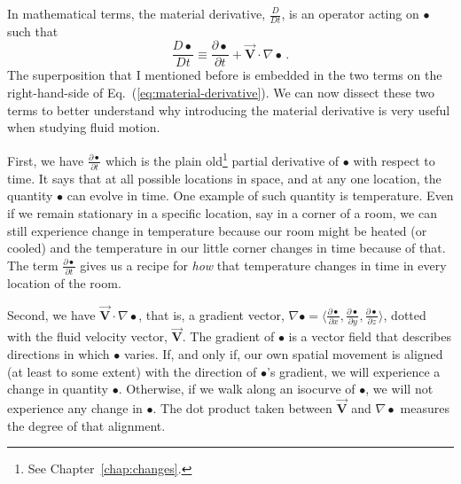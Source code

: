 In mathematical terms, the material derivative, $\frac{D}{Dt}$, is an operator acting on $\bullet$ such that
\begin{equation} \label{eq:material-derivative}
\frac{D \bullet}{D t} \equiv \frac{\partial \bullet}{\partial t} + \vec{\bm{V}} \cdot \nabla \bullet \, .
\end{equation}
The superposition that I mentioned before is embedded in the two terms on the right-hand-side of Eq.~(\ref{eq:material-derivative}).
We can now dissect these two terms to better understand why introducing the material derivative is very useful when studying fluid motion.

First, we have $\frac{\partial \bullet}{\partial t}$ which is the plain old\footnote{See Chapter~\ref{chap:changes}.} partial derivative of $\bullet$ with respect to time. It says that at all possible locations in space, and at any one location, the quantity $\bullet$ can evolve in time. One example of such quantity is temperature. Even if we remain stationary in a specific location, say in a corner of a room, we can still experience change in temperature because our room might be heated (or cooled) and the temperature in our little corner changes in time because of that. The term $\frac{\partial \bullet}{\partial t}$ gives us a recipe for \textit{how} that temperature changes in time in every location of the room.

Second, we have $\vec{\bm{V}} \cdot \nabla \bullet$, that is, a gradient vector, $\nabla \bullet = \langle \frac{\partial \bullet}{\partial x}, \frac{\partial \bullet}{\partial y}, \frac{\partial \bullet}{\partial z} \rangle$, dotted with the fluid velocity vector, $\vec{\bm{V}}$. 
The gradient of $\bullet$ is a vector field that describes directions in which $\bullet$ varies. If, and only if, our own spatial movement is aligned (at least to some extent) with the direction of $\bullet$'s gradient, we will experience a change in quantity $\bullet$. Otherwise, if we walk along an isocurve of $\bullet$, we will not experience any change in $\bullet$. The dot product taken between $\vec{\bm{V}}$ and $\nabla \bullet$ measures the degree of that alignment.

